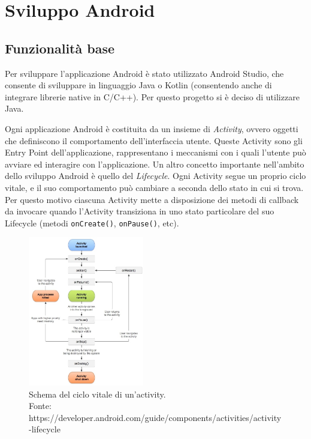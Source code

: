 \chapter{Sviluppo Android}

\section{Funzionalità base}

Per sviluppare l'applicazione Android è stato utilizzato Android Studio, che consente di sviluppare in linguaggio Java o
Kotlin (consentendo anche di integrare librerie native in C/C++). Per questo progetto si è deciso di utilizzare Java.

Ogni applicazione Android è costituita da un insieme di \textit{Activity}, ovvero oggetti che definiscono il comportamento
dell'interfaccia utente. Queste Activity sono gli Entry Point dell'applicazione, rappresentano i meccanismi con i quali
l'utente può avviare ed interagire con l'applicazione.
Un altro concetto importante nell'ambito dello sviluppo Android è quello del \textit{Lifecycle}. Ogni Activity segue un proprio
ciclo vitale, e il suo comportamento può cambiare a seconda dello stato in cui si trova. Per questo motivo ciascuna Activity
mette a disposizione dei metodi di callback da invocare quando l'Activity transiziona in uno stato particolare del suo 
Lifecycle (metodi \texttt{onCreate()}, \texttt{onPause()}, etc).

\begin{figure}[h!]
    \includegraphics[width=0.45\textwidth]{img/activity_lifecycle.jpg}
    \centering
    \caption{Schema del ciclo vitale di un'activity. \\
    Fonte: https://developer.android.com/guide/components/activities/activity-lifecycle}
    \label{fig:activity_lifecycle}
\end{figure}

